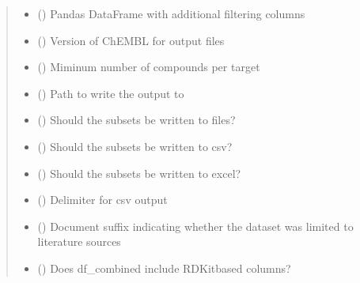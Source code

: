 \documentclass[letterpaper,10pt,english]{sphinxmanual}
\begin{document}
\begin{fulllineitems}
\begin{quote}
\begin{description}
\begin{itemize}
\item {} 
\sphinxAtStartPar
{} () \textendash{} Pandas DataFrame with additional filtering columns

\item {} 
\sphinxAtStartPar
{} () \textendash{} Version of ChEMBL for output files

\item {} 
\sphinxAtStartPar
{} () \textendash{} Miminum number of compounds per target

\item {} 
\sphinxAtStartPar
{} () \textendash{} Path to write the output to

\item {} 
\sphinxAtStartPar
{} () \textendash{} Should the subsets be written to files?

\item {} 
\sphinxAtStartPar
{} () \textendash{} Should the subsets be written to csv?

\item {} 
\sphinxAtStartPar
{} () \textendash{} Should the subsets be written to excel?

\item {} 
\sphinxAtStartPar
{} () \textendash{} Delimiter for csv output

\item {} 
\sphinxAtStartPar
{} () \textendash{} Document suffix indicating
whether the dataset was limited to literature sources

\item {} 
\sphinxAtStartPar
{} () \textendash{} Does df\_combined include RDKit\sphinxhyphen{}based columns?


\end{itemize}
\end{description}
\end{quote}
\end{fulllineitems}
\end{document}

